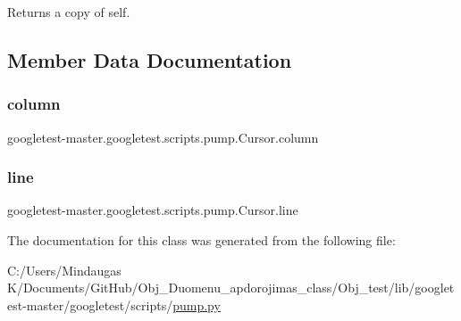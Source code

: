 \begin{DoxyVerb}Returns a copy of self.\end{DoxyVerb}
 

\subsection{Member Data Documentation}
\mbox{\label{classgoogletest-master_1_1googletest_1_1scripts_1_1pump_1_1_cursor_a963de3452b99715edfe4d3e0efe2727f}} 
\subsubsection{\texorpdfstring{column}{column}}
{\footnotesize\ttfamily googletest-\/master.\+googletest.\+scripts.\+pump.\+Cursor.\+column}

\mbox{\label{classgoogletest-master_1_1googletest_1_1scripts_1_1pump_1_1_cursor_ae223ac7e9a32aab12d78ff9a43bdd250}} 
\subsubsection{\texorpdfstring{line}{line}}
{\footnotesize\ttfamily googletest-\/master.\+googletest.\+scripts.\+pump.\+Cursor.\+line}



The documentation for this class was generated from the following file\+:\begin{DoxyCompactItemize}
\item 
C\+:/\+Users/\+Mindaugas K/\+Documents/\+Git\+Hub/\+Obj\+\_\+\+Duomenu\+\_\+apdorojimas\+\_\+class/\+Obj\+\_\+test/lib/googletest-\/master/googletest/scripts/\mbox{\hyperlink{_obj__test_2lib_2googletest-master_2googletest_2scripts_2pump_8py}{pump.\+py}}\end{DoxyCompactItemize}
